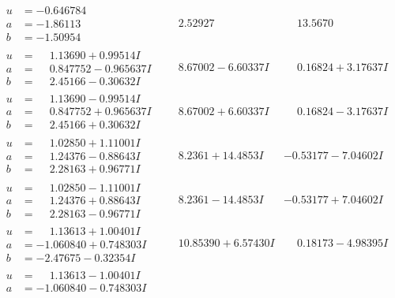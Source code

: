 \documentclass[1p]{elsarticle_modified}
\theoremstyle{definition}
\begin{document}
$$\begin{array}{c|c|c}
\begin{aligned}
u &= -0.646784\phantom{ +0.000000I} \\
a &= -1.86113\phantom{ +0.000000I} \\
b &= -1.50954\phantom{ +0.000000I}\end{aligned}
 & \phantom{-}2.52927\phantom{ +0.000000I} & \phantom{-}13.5670\phantom{ +0.000000I} \\ \hline\begin{aligned}
u &= \phantom{-}1.13690 + 0.99514 I \\
a &= \phantom{-}0.847752 - 0.965637 I \\
b &= \phantom{-}2.45166 - 0.30632 I\end{aligned}
 & \phantom{-}8.67002 - 6.60337 I & \phantom{-}0.16824 + 3.17637 I \\ \hline\begin{aligned}
u &= \phantom{-}1.13690 - 0.99514 I \\
a &= \phantom{-}0.847752 + 0.965637 I \\
b &= \phantom{-}2.45166 + 0.30632 I\end{aligned}
 & \phantom{-}8.67002 + 6.60337 I & \phantom{-}0.16824 - 3.17637 I \\ \hline\begin{aligned}
u &= \phantom{-}1.02850 + 1.11001 I \\
a &= \phantom{-}1.24376 - 0.88643 I \\
b &= \phantom{-}2.28163 + 0.96771 I\end{aligned}
 & \phantom{-}8.2361 + 14.4853 I & -0.53177 - 7.04602 I \\ \hline\begin{aligned}
u &= \phantom{-}1.02850 - 1.11001 I \\
a &= \phantom{-}1.24376 + 0.88643 I \\
b &= \phantom{-}2.28163 - 0.96771 I\end{aligned}
 & \phantom{-}8.2361 - 14.4853 I & -0.53177 + 7.04602 I \\ \hline\begin{aligned}
u &= \phantom{-}1.13613 + 1.00401 I \\
a &= -1.060840 + 0.748303 I \\
b &= -2.47675 - 0.32354 I\end{aligned}
 & \phantom{-}10.85390 + 6.57430 I & \phantom{-}0.18173 - 4.98395 I \\ \hline\begin{aligned}
u &= \phantom{-}1.13613 - 1.00401 I \\
a &= -1.060840 - 0.748303 I \\

\end{aligned}
\end{array}$$
\end{document}
